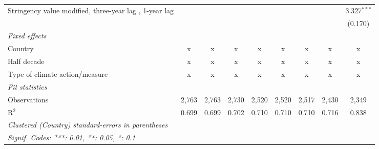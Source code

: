 \begin{table}[htbp]
\begin{tabular}{lcccccccc}
      Stringency value modified, three-year lag , 1-year lag                  &              &               &               &                &                &                &                & 3.327$^{***}$\\   
                                                                              &              &               &               &                &                &                &                & (0.170)\\   
      \emph{Fixed effects}\\
      Country                                                                 & x            & x             & x             & x              & x              & x              & x              & x\\  
      Half decade                                                             & x            & x             & x             & x              & x              & x              & x              & x\\  
      Type of climate action/measure                                          & x            & x             & x             & x              & x              & x              & x              & x\\  
      \midrule \emph{Fit statistics}\\
      Observations                                                            & 2,763        & 2,763         & 2,730         & 2,520          & 2,520          & 2,517          & 2,430          & 2,349\\  
      R$^2$                                                                   & 0.699        & 0.699         & 0.702         & 0.710          & 0.710          & 0.710          & 0.716          & 0.838\\  
      \midrule
      \multicolumn{9}{l}{\emph{Clustered (Country) standard-errors in parentheses}}\\
      \multicolumn{9}{l}{\emph{Signif. Codes: ***: 0.01, **: 0.05, *: 0.1}}\\
   \end{tabular}
\end{table}


